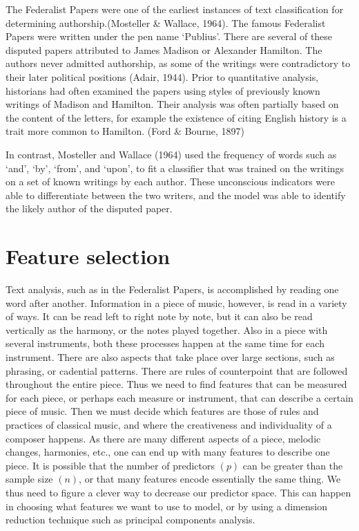 \documentclass[12pt,twoside]{reedthesis}
\theoremstyle{definition}
\theoremstyle{definition}
\theoremstyle{definition}
\theoremstyle{remark}
\begin{document}
The Federalist Papers were one of the earliest instances of text
classification for determining authorship.(Mosteller \& Wallace, 1964).
The famous Federalist Papers were written under the pen name `Publius'.
There are several of these disputed papers attributed to James Madison
or Alexander Hamilton. The authors never admitted authorship, as some of
the writings were contradictory to their later political positions
(Adair, 1944). Prior to quantitative analysis, historians had often
examined the papers using styles of previously known writings of Madison
and Hamilton. Their analysis was often partially based on the content of
the letters, for example the existence of citing English history is a
trait more common to Hamilton. (Ford \& Bourne, 1897)

In contrast, Mosteller and Wallace (1964) used the frequency of words
such as `and', `by', `from', and `upon', to fit a classifier that was
trained on the writings on a set of known writings by each author. These
unconscious indicators were able to differentiate between the two
writers, and the model was able to identify the likely author of the
disputed paper.

\section{Feature selection}\label{feature-selection}

Text analysis, such as in the Federalist Papers, is accomplished by
reading one word after another. Information in a piece of music,
however, is read in a variety of ways. It can be read left to right note
by note, but it can also be read vertically as the harmony, or the notes
played together. Also in a piece with several instruments, both these
processes happen at the same time for each instrument. There are also
aspects that take place over large sections, such as phrasing, or
cadential patterns. There are rules of counterpoint that are followed
throughout the entire piece. Thus we need to find features that can be
measured for each piece, or perhaps each measure or instrument, that can
describe a certain piece of music. Then we must decide which features
are those of rules and practices of classical music, and where the
creativeness and individuality of a composer happens. As there are many
different aspects of a piece, melodic changes, harmonies, etc., one can
end up with many features to describe one piece. It is possible that the
number of predictors \((p)\) can be greater than the sample size
\((n)\), or that many features encode essentially the same thing. We
thus need to figure a clever way to decrease our predictor space. This
can happen in choosing what features we want to use to model, or by
using a dimension reduction technique such as principal components
analysis.
\end{document}
